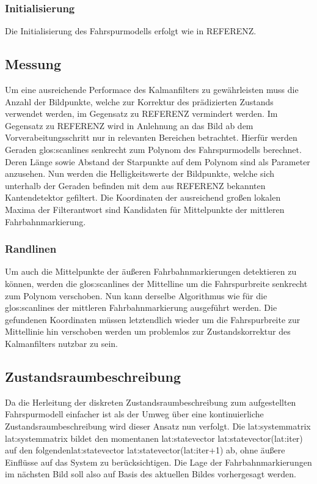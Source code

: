 \subsubsection{Initialisierung} 
\label{sssec:fahrspurerkennung:kalman:fahrspurmodell:initialisierung}
 Die Initialisierung des Fahrspurmodells erfolgt wie in REFERENZ.
 
\subsection{Messung} \label{ssec:fahrspurerkennung:kalman:messung}
Um eine ausreichende Performace des Kalmanfilters zu gewährleisten muss die Anzahl der Bildpunkte, welche zur Korrektur des prädizierten Zustands verwendet werden, im Gegensatz zu REFERENZ vermindert werden. Im Gegensatz zu REFERENZ wird in Anlehnung an \autocite{risackRobustLaneRecognition} das Bild ab dem Vorverabeitungsschritt nur in relevanten Bereichen betrachtet.
Hierfür werden Geraden \flq \glspl{glos:scanline} \frq senkrecht zum Polynom des Fahrspurmodells berechnet. Deren Länge sowie Abstand der Starpunkte auf dem Polynom sind als Parameter anzusehen. Nun werden die Helligkeitswerte der Bildpunkte, welche sich unterhalb der Geraden befinden mit dem aus REFERENZ bekannten Kantendetektor gefiltert. Die Koordinaten der ausreichend großen lokalen Maxima der Filterantwort sind Kandidaten für Mittelpunkte der mittleren Fahrbahnmarkierung.
\subsubsection{Randlinen}
Um auch die Mittelpunkte der äußeren Fahrbahnmarkierungen detektieren zu können, werden die \glspl{glos:scanline} der Mittelline um die Fahrspurbreite senkrecht zum Polynom verschoben. Nun kann derselbe Algorithmus wie für die \glspl{glos:scanline} der mittleren Fahrbahnmarkierung ausgeführt werden. Die gefundenen Koordinaten müssen letztendlich wieder um die Fahrspurbreite zur Mittellinie hin verschoben werden um problemlos zur Zustandskorrektur des Kalmanfilters nutzbar zu sein.
 
\subsection{Zustandsraumbeschreibung}
Da die Herleitung der diskreten Zustandsraumbeschreibung zum aufgestellten Fahrspurmodell einfacher ist als der Umweg über eine kontinuierliche Zustandsraumbeschreibung  wird dieser Ansatz nun verfolgt.
Die \glsdesc{lat:systemmatrix} \gls{lat:systemmatrix} bildet den momentanen \glsdesc{lat:statevector} \gls{lat:statevector}(\gls{lat:iter}) auf den folgenden\glsdesc{lat:statevector} \gls{lat:statevector}(\gls{lat:iter}+1) ab, ohne äußere Einflüsse auf das System zu berücksichtigen. Die Lage der Fahrbahnmarkierungen im nächsten Bild soll also auf Basis des aktuellen Bildes vorhergesagt werden.

